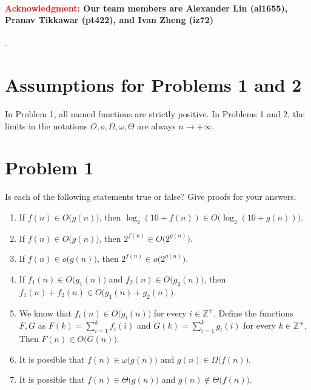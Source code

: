 \paragraph{\textcolor{red}{Acknowledgment:} Our team members are \textbf{Alexander Lin (al1655)}, \textbf{Pranav Tikkawar (pt422)}, and \textbf{Ivan Zheng (iz72)}}.

\section*{Assumptions for Problems 1 and 2}
In Problem 1, all named functions are strictly positive. In Problems 1 and 2, the limits in the notations $O, o, \Omega, \omega, \Theta$ are always $n \to +\infty$.

\section*{Problem 1}
Is each of the following statements true or false? Give proofs for your answers.
\begin{enumerate}
    \item If $f(n) \in O\big(g(n)\big)$, then $\log_2 (10 + f(n)) \in O\big(\log_2 (10 + g(n))\big)$.
    \item If $f(n) \in O\big(g(n)\big)$, then $2^{f(n)} \in O\big(2^{g(n)}\big)$.
    \item If $f(n) \in o\big(g(n)\big)$, then $2^{f(n)} \in o\big(2^{g(n)}\big)$.
    \item If $f_1(n) \in O\big(g_1(n)\big)$ and $f_2(n) \in O\big(g_2(n)\big)$, then $f_1(n) + f_2(n) \in O\big(g_1(n) + g_2(n)\big)$.
    \item We know that $f_i(n) \in O\big(g_i(n)\big)$ for every $i \in \mathbb{Z}^+$. Define the functions $F, G$ as $F(k) = \sum_{i = 1}^k f_i(i)$ and $G(k) = \sum_{i = 1}^k g_i(i)$ for every $k \in \mathbb{Z}^+$. Then $F(n) \in O\big(G(n)\big)$.
    \item It is possible that $f(n) \in \omega\big(g(n)\big)$ and $g(n) \in \Omega\big(f(n)\big)$.
    \item It is possible that $f(n) \in \Theta\big(g(n)\big)$ and $g(n) \notin \Theta\big(f(n)\big)$.
\end{enumerate}

